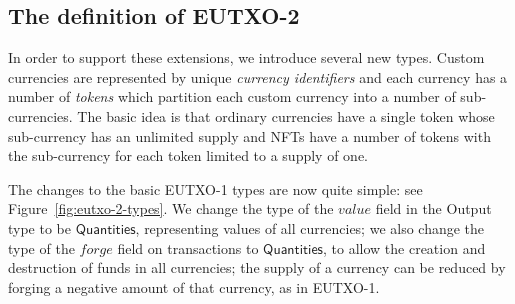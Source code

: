 \documentclass[a4paper]{article}
\newcommand{\s}{\textsf}  %
\newcommand{\mi}[1]{\ensuremath{\mathit{#1}}}
\newcommand{\forge}{\mi{forge}}
\newcommand{\val}{\mi{value}}  %
\newcommand{\qtymap}{\ensuremath{\s{Quantities}}}
\begin{document}
\subsection{The definition of EUTXO-2}
In order to support these extensions, we introduce several new types.
Custom currencies are represented by unique \textit{currency
  identifiers} and each currency has a number of \textit{tokens} which
partition each custom currency into a number of sub-currencies.  The
basic idea is that ordinary currencies have a single token whose
sub-currency has an unlimited supply and NFTs have a number of tokens
with the sub-currency for each token limited to a supply of one.

The changes to the basic EUTXO-1 types are now quite simple:
see Figure~\ref{fig:eutxo-2-types}.  We change the type of the $\val$ field
in the \s{Output} type to be \qtymap{}, representing values of all currencies;
we also change the type of the \forge{} field on transactions to \qtymap{}, to
allow the creation and destruction of funds in all currencies; the
supply of a currency can be reduced by forging a negative amount of that
currency, as in EUTXO-1.
\end{document}
